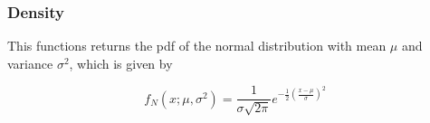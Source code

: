 %


%
%




\subsubsection{Density}
\label{sec:NormalDistribution_pdf}
%

\vspace{0.3cm}
This functions returns the pdf of the normal distribution with mean $\mu$ and variance $\sigma^2$, which is given by

\begin{equation} \label{eq:Normal_pdf}
	f_N(x; \mu, \sigma^2) = \frac{1}{\sigma \sqrt{2\pi}} e^{- \frac{1}{2} \left(\frac{x-\mu}{\sigma}\right)^2}
\end{equation}

